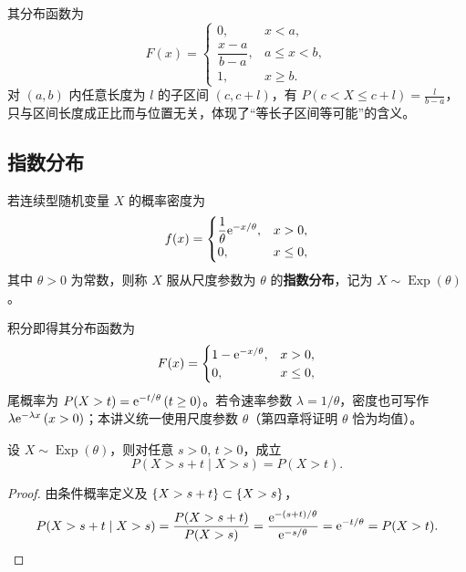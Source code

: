 其分布函数为
\[
  F(x)=
  \begin{cases}
    0,& x<a,\\
    \dfrac{x-a}{b-a},& a\le x<b,\\
    1,& x\ge b.
  \end{cases}
\]
对 $(a,b)$ 内任意长度为 $l$ 的子区间 $(c,c+l)$，有 $P(c<X\le c+l)=\frac{l}{b-a}$，只与区间长度成正比而与位置无关，体现了“等长子区间等可能”的含义。

\subsection{指数分布}

\begin{definition}[指数分布]
\label{def:exponential}
若连续型随机变量 $X$ 的概率密度为
\begin{equation}
  f(x)=
  \begin{cases}
    \dfrac{1}{\theta}\mathrm{e}^{-x/\theta},& x>0,\\
    0,& x\le 0,
  \end{cases}
  \label{eq:exponential-density}
\end{equation}
其中 $\theta>0$ 为常数，则称 $X$ 服从尺度参数为 $\theta$ 的\textbf{指数分布}，记为 $X\sim\operatorname{Exp}(\theta)$。
\end{definition}

积分即得其分布函数为
\begin{equation}
  F(x)=
  \begin{cases}
    1-\mathrm{e}^{-x/\theta},& x>0,\\
    0,& x\le 0,
  \end{cases}
  \label{eq:exponential-cdf}
\end{equation}
尾概率为 $P(X>t)=\mathrm{e}^{-t/\theta}\,(t\ge 0)$。若令速率参数 $\lambda=1/\theta$，密度也可写作 $\lambda\mathrm{e}^{-\lambda x}\,(x>0)$；本讲义统一使用尺度参数 $\theta$（第四章将证明 $\theta$ 恰为均值）。

\begin{proposition}[指数分布的无记忆性]
\label{prop:exp-memoryless}
设 $X\sim\operatorname{Exp}(\theta)$，则对任意 $s>0,\,t>0$，成立
\begin{equation}
  P(X>s+t\mid X>s)=P(X>t).
  \label{eq:exp-memoryless}
\end{equation}
\end{proposition}
\begin{proof}
由条件概率定义及 $\{X>s+t\}\subset\{X>s\}$，
\[
  P(X>s+t\mid X>s)=\frac{P(X>s+t)}{P(X>s)}
  =\frac{\mathrm{e}^{-(s+t)/\theta}}{\mathrm{e}^{-s/\theta}}=\mathrm{e}^{-t/\theta}=P(X>t).
\]
\end{proof}

